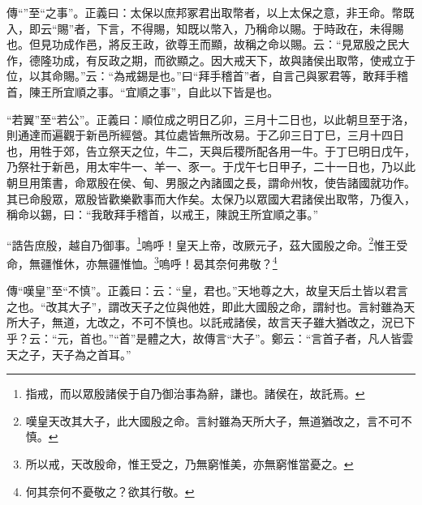 {\noindent\zhuan{}\fzbyks 傳“”至“之事”。正義曰：太保以庶邦冢君出取幣者，以上太保之意，非王命。幣既入，即云“賜”者，下言，不得賜，知既以幣入，乃稱命以賜。于時政在，未得賜也。但見功成作邑，將反王政，欲尊王而顯，故稱之命以賜。云：“見眾殷之民大作，德隆功成，有反政之期，而欲顯之。因大戒天下，故與諸侯出取幣，使戒立于位，以其命賜。”云：“為戒錫是也。”曰“拜手稽首”者，自言己與冢君等，敢拜手稽首，陳王所宜順之事。“宜順之事”，自此以下皆是也。 \par}

{\noindent\shu{}\fzkt “若翼”至“若公”。正義曰：順位成之明日乙卯，三月十二日也，以此朝旦至于洛，則通達而遍觀于新邑所經營。其位處皆無所改易。于乙卯三日丁巳，三月十四日也，用牲于郊，告立祭天之位，牛二，天與后稷所配各用一牛。于丁巳明日戊午，乃祭社于新邑，用太牢牛一、羊一、豕一。于戊午七日甲子，二十一日也，乃以此朝旦用策書，命眾殷在侯、甸、男服之內諸國之長，謂命州牧，使告諸國就功作。其已命殷眾，眾殷皆歡樂歡事而大作矣。太保乃以眾國大君諸侯出取幣，乃復入，稱命以錫，曰：“我敢拜手稽首，以戒王，陳說王所宜順之事。” \par}

“誥告庶殷，越自乃御事。\footnote{指戒，而以眾殷諸侯于自乃御治事為辭，謙也。諸侯在，故託焉。}嗚呼！皇天上帝，改厥元子，茲大國殷之命。\footnote{嘆皇天改其大子，此大國殷之命。言紂雖為天所大子，無道猶改之，言不可不慎。}惟王受命，無疆惟休，亦無疆惟恤。\footnote{所以戒，天改殷命，惟王受之，乃無窮惟美，亦無窮惟當憂之。}嗚呼！曷其奈何弗敬？\footnote{何其奈何不憂敬之？欲其行敬。}


{\noindent\zhuan{}\fzbyks 傳“嘆皇”至“不慎”。正義曰：云：“皇，君也。”天地尊之大，故皇天后土皆以君言之也。“改其大子”，謂改天子之位與他姓，即此大國殷之命，謂紂也。言紂雖為天所大子，無道，尢改之，不可不慎也。以託戒諸侯，故言天子雖大猶改之，況已下乎？云：“元，首也。”“首”是體之大，故傳言“大子”。鄭云：“言首子者，凡人皆雲天之子，天子為之首耳。” \par}

